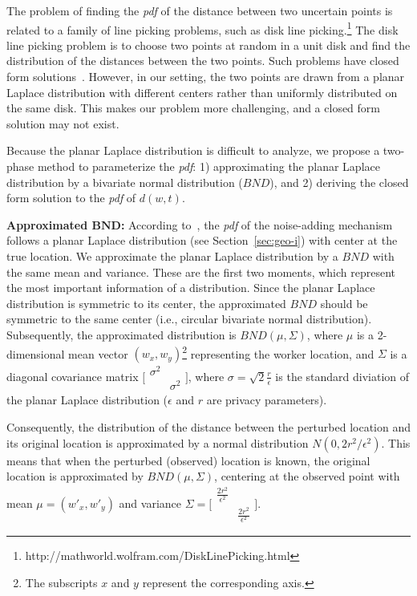 \documentclass{USC-Thesis}
\numberwithin{equation}{chapter}
\begin{document}
The problem of finding the \emph{pdf} of the distance between two uncertain points is related to a family of line picking problems, such as disk line picking.\footnote{http://mathworld.wolfram.com/DiskLinePicking.html} The disk line picking problem is to choose two points at random in a unit disk and find the distribution of the distances between the two points. Such problems have closed form solutions~\cite{tu2002random}. However, in our setting, the two points are drawn from a planar Laplace distribution with different centers rather than uniformly distributed on the same disk. This makes our problem more challenging, and a closed form solution may not exist. 

Because the planar Laplace distribution is difficult to analyze, we propose a two-phase method to parameterize the \emph{pdf}: 1) approximating the planar Laplace distribution by a bivariate normal distribution ($\mathit{BND}$), and 2) deriving the closed form solution to the \emph{pdf} of $d(w,t)$.

\textbf{Approximated $\mathit{\mathbf{BND}}$:}
According to~\cite{andres2013geo}, the \emph{pdf} of the noise-adding mechanism follows a planar Laplace distribution (see Section~\ref{sec:geo-i}) with center at the true location. We approximate the planar Laplace distribution by a $\mathit{BND}$ with the same mean and variance. These are the first two moments, which represent the most important information of a distribution. Since the planar Laplace distribution is symmetric to its center, the approximated $\mathit{BND}$ should be symmetric to the same center (i.e., circular bivariate normal distribution). Subsequently, the approximated distribution is $\mathit{BND(\mu,\Sigma)}$, where $\mu$ is a 2-dimensional mean vector $(w_x,w_y)$\footnote{The subscripts $x$ and $y$ represent the corresponding axis. } representing the worker location, and $\Sigma$ is a diagonal covariance matrix $\bigl[ \begin{smallmatrix} \sigma^2&\\&\sigma^2\end{smallmatrix}\bigr]$, where $\sigma=\sqrt{2}\frac{r}{\epsilon}$ is the standard diviation of the planar Laplace distribution ($\epsilon$ and $r$ are privacy parameters).

Consequently, the distribution of the distance between the perturbed location and its original location is approximated by a normal distribution $\mathit{N(0,2r^2/\epsilon^2)}$. This means that when the perturbed (observed) location is known, the original location is approximated by $\mathit{BND(\mu,\Sigma)}$, centering at the observed point with mean $\mu=(w'_x,w'_y)$ and variance $\Sigma=\bigl[ \begin{smallmatrix}\frac{2r^2}{\epsilon^2}&\\&\frac{2r^2}{\epsilon^2}\end{smallmatrix}\bigr]$.
\end{document}
